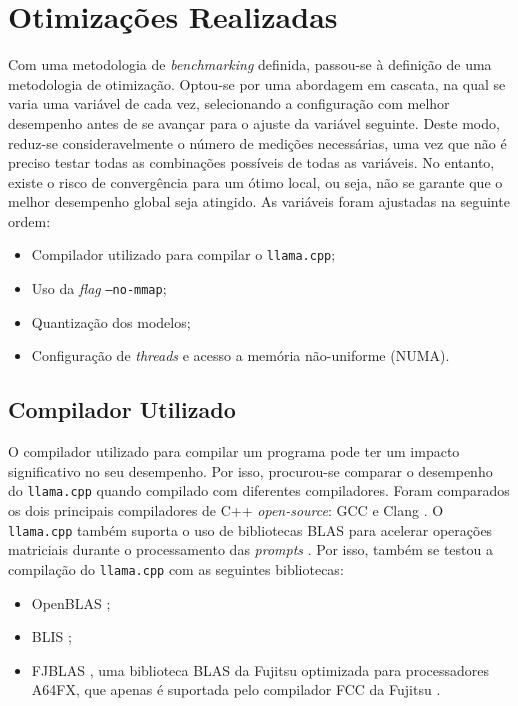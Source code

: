 \documentclass[11pt, a4paper]{article}
\begin{document}
\section{Otimizações Realizadas} %

Com uma metodologia de \emph{benchmarking} definida, passou-se à definição de uma metodologia de
otimização. Optou-se por uma abordagem em cascata, na qual se varia uma variável de cada vez,
selecionando a configuração com melhor desempenho antes de se avançar para o ajuste da variável
seguinte. Deste modo, reduz-se consideravelmente o número de medições necessárias, uma vez que não é
preciso testar todas as combinações possíveis de todas as variáveis. No entanto, existe o risco de
convergência para um ótimo local, ou seja, não se garante que o melhor desempenho global seja
atingido. As variáveis foram ajustadas na seguinte ordem:

\begin{itemize}
    \item Compilador utilizado para compilar o \texttt{llama.cpp};
    \item Uso da \emph{flag} \texttt{--no-mmap};
    \item Quantização dos modelos;
    \item Configuração de \emph{threads} e acesso a memória não-uniforme (NUMA).
\end{itemize}

\subsection{Compilador Utilizado}

O compilador utilizado para compilar um programa pode ter um impacto significativo no seu
desempenho. Por isso, procurou-se comparar o desempenho do \texttt{llama.cpp} quando compilado com
diferentes compiladores. Foram comparados os dois principais compiladores de C++ \emph{open-source}:
GCC \cite{gcc} e Clang \cite{clang}. O \texttt{llama.cpp} também suporta o uso de bibliotecas BLAS
para acelerar operações matriciais durante o processamento das \emph{prompts} \cite{llama-build}.
Por isso, também se testou a compilação do \texttt{llama.cpp} com as seguintes bibliotecas:

\begin{itemize}
    \item OpenBLAS \cite{openblas};
    \item BLIS \cite{blis};
    \item FJBLAS \cite{fjblas}, uma biblioteca BLAS da Fujitsu optimizada para processadores
          A64FX, que apenas é suportada pelo compilador FCC da Fujitsu \cite{fcc}.
\end{itemize}
\end{document}

